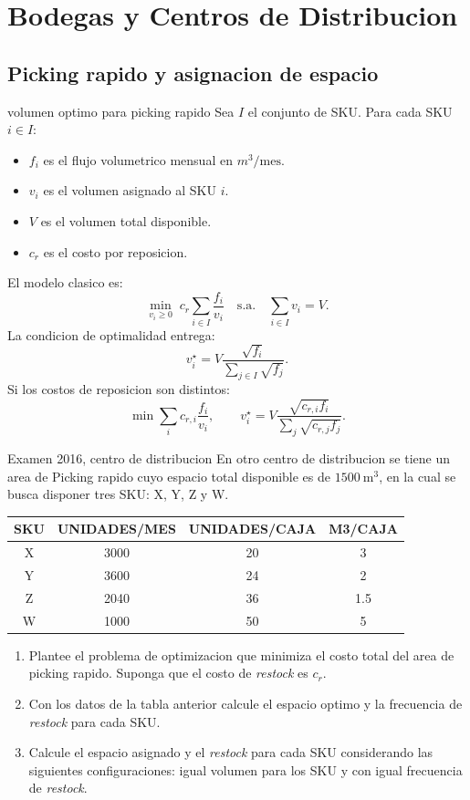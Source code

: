 \section{Bodegas y Centros de Distribucion}

\subsection{Picking rapido y asignacion de espacio}

\begin{materia}{volumen optimo para picking rapido}
Sea $I$ el conjunto de SKU. Para cada SKU $i\in I$:
\begin{itemize}
  \item $f_i$ es el flujo volumetrico mensual en $m^3/\text{mes}$.
  \item $v_i$ es el volumen asignado al SKU $i$.
  \item $V$ es el volumen total disponible.
  \item $c_r$ es el costo por reposicion.
\end{itemize}
El modelo clasico es:
\[
  \min_{v_i\ge 0}\; c_r\sum_{i\in I}\frac{f_i}{v_i}
  \quad \text{s.a.}\quad
  \sum_{i\in I}v_i=V.
\]
La condicion de optimalidad entrega:
\[
  v_i^\star=V\frac{\sqrt{f_i}}{\sum_{j\in I}\sqrt{f_j}}.
\]
Si los costos de reposicion son distintos:
\[
  \min \sum_i c_{r,i}\frac{f_i}{v_i},
  \qquad
  v_i^\star=V\frac{\sqrt{c_{r,i}f_i}}{\sum_j\sqrt{c_{r,j}f_j}}.
\]
\end{materia}

\begin{enunciado}{Examen 2016, centro de distribucion}
En otro centro de distribucion se tiene un area de Picking rapido cuyo espacio total disponible es de $1500\ \text{m}^3$, en la cual se busca disponer tres SKU: X, Y, Z y W.

\begin{center}
\begin{tabular}{c|ccc}
\toprule
SKU & UNIDADES/MES & UNIDADES/CAJA & M3/CAJA\\
\midrule
X & 3000 & 20 & 3\\
Y & 3600 & 24 & 2\\
Z & 2040 & 36 & 1.5\\
W & 1000 & 50 & 5\\
\bottomrule
\end{tabular}
\end{center}

\begin{enumerate}[label=\alph*)]
  \item Plantee el problema de optimizacion que minimiza el costo total del area de picking rapido. Suponga que el costo de \emph{restock} es $c_r$.
  \item Con los datos de la tabla anterior calcule el espacio optimo y la frecuencia de \emph{restock} para cada SKU.
  \item Calcule el espacio asignado y el \emph{restock} para cada SKU considerando las siguientes configuraciones: igual volumen para los SKU y con igual frecuencia de \emph{restock}.
\end{enumerate}
\end{enunciado}

